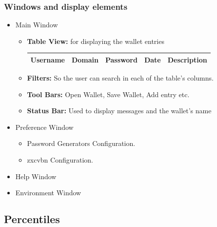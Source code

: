 \documentclass[14pt,usenames,dvipsnames]{beamer}
\begin{document}
\begin{frame}
	\frametitle{Windows and display elements}

  \begin{itemize}
    \setlength\itemsep{10pt}
    \item<1-> Main Window
      \begin{itemize}
		    \item<2-> \textbf{\color{NavyBlue} Table View:} for displaying the wallet entries
	\begin{table}
		\begin{tabular}{|c|c|c|c|c|}
		\hline
		\textbf{Username} & \textbf{Domain} & \textbf{Password} & \textbf{Date} &\textbf{Description}  \\ 
		\hline
		\end{tabular}
		\end{table}
				    
		    
		    \item<3-> \textbf{\color{NavyBlue} Filters:} So the user can search in each of the table's columns.
		    \item<4-> \textbf{\color{NavyBlue} Tool Bars:} Open Wallet, Save Wallet, Add entry etc.
		    \item<5-> \textbf{\color{NavyBlue} Status Bar:} Used to display messages and the wallet's name
      \end{itemize}
      
     \item<6-> Preference Window
       \begin{itemize}
	       \item Password Generators Configuration.
	       \item zxcvbn Configuration.
	     \end{itemize}
     \item<7-> Help Window
     \item<8-> Environment Window
	 \end{itemize}
\end{frame}



\subsection{Percentiles}
\end{document}
